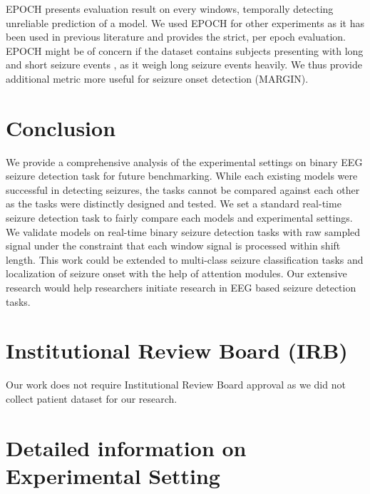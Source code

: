 \documentclass[pmlr,twocolumn,10pt]{jmlr}
\begin{document}
EPOCH presents evaluation result on every windows, temporally detecting unreliable prediction of a model. We used EPOCH for other experiments as it has been used in previous literature and provides the strict, per epoch evaluation. EPOCH might be of concern if the dataset contains subjects presenting with long and short seizure events \citep{ziyabari2017objective}, as it weigh long seizure events heavily. We thus provide additional metric more useful for seizure onset detection (MARGIN). \section{Conclusion}
\label{sec:conclusion}
We provide a comprehensive analysis of the experimental settings on binary EEG seizure detection task for future benchmarking. While each existing models were successful in detecting seizures, the tasks cannot be compared against each other as the tasks were distinctly designed and tested. We set a standard real-time seizure detection task to fairly compare each models and experimental settings. We validate models on real-time binary seizure detection tasks with raw sampled signal under the constraint that each window signal is processed within shift length. This work could be extended to multi-class seizure classification tasks and localization of seizure onset with the help of attention modules. Our extensive research would help researchers initiate research in EEG based seizure detection tasks. 
\section{Institutional Review Board (IRB)}
Our work does not require Institutional Review Board approval as we did not collect patient dataset for our research.




\clearpage
\appendix
\section{Detailed information on Experimental Setting}
\end{document}
